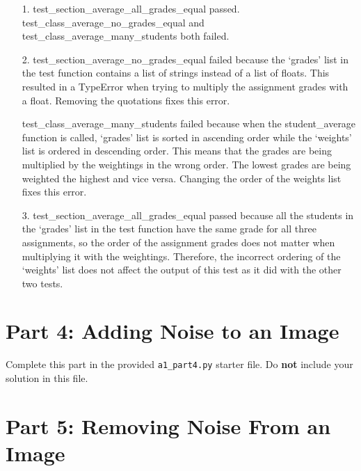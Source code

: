 \documentclass[fontsize=11pt]{article}
\begin{document}

\begin{enumerate}
\item[1.]
test\_section\_average\_all\_grades\_equal passed. 
\\test\_class\_average\_no\_grades\_equal and test\_class\_average\_many\_students both failed.

\item[2.]
test\_section\_average\_no\_grades\_equal failed because the `grades' list in the test function contains a list of strings instead of a list of floats. This resulted in a TypeError when trying to multiply the assignment grades with a float. Removing the quotations fixes this error.

test\_class\_average\_many\_students failed because when the student\_average function is called, `grades' list is sorted in ascending order while the `weights' list is ordered in descending order. This means that the grades are being multiplied by the weightings in the wrong order. The lowest grades are being weighted the highest and vice versa. Changing the order of the weights list fixes this error.

\item[3.]
test\_section\_average\_all\_grades\_equal passed because all the students in the `grades' list in the test function have the same grade for all three assignments, so the order of the assignment grades does not matter when multiplying it with the weightings. Therefore, the incorrect ordering of the `weights' list does not affect the output of this test as it did with the other two tests.
\end{enumerate}

\section*{Part 4: Adding Noise to an Image}

Complete this part in the provided \texttt{a1\_part4.py} starter file.
Do \textbf{not} include your solution in this file.

\newpage

\section*{Part 5: Removing Noise From an Image}
\end{document}
